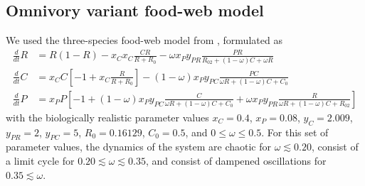 \subsection{Omnivory variant food-web model}
We used the three-species food-web model from \cite{McCann1997}, formulated as
\begin{equation}
    \begin{aligned}
        \tfrac{d}{dt} R &= R ( 1 - R ) - x_C x_C \frac{CR}{R + R_0} - \omega x_P y_{PR} \frac{PR}{R_{02} + (1-\omega)C + \omega R}\\
        \tfrac{d}{dt} C &= x_C C \left[ -1 + x_C \frac{R}{R + R_0} \right] - (1 - \omega) x_P y_{PC} \frac{PC}{\omega R +(1-\omega)C + C_0}\\
        \tfrac{d}{dt} P &= x_P P \left[ -1 + (1 - \omega)x_P y_{PC} \frac{C}{\omega R + (1-\omega)C+C_0} + \omega x_P y_{PR}\frac{R}{\omega R + (1-\omega)C + R_{02}} \right]
    \end{aligned}
\end{equation}
with the biologically realistic parameter values $x_C = 0.4$, $ x_P = 0.08 $, $y_C = 2.009$, $y_{PR} = 2$, $y_{PC} = 5$, $R_0 = 0.16129$, $C_0 = 0.5$, and $0 \leq \omega \leq 0.5$.
% 
For this set of parameter values, the dynamics of the system are chaotic for $\omega \lesssim 0.20$, consist of a limit cycle for $0.20 \lesssim \omega \lesssim 0.35$, and consist of dampened oscillations for $ 0.35 \lesssim \omega$.

\printbibliography[heading=subbibliography]


